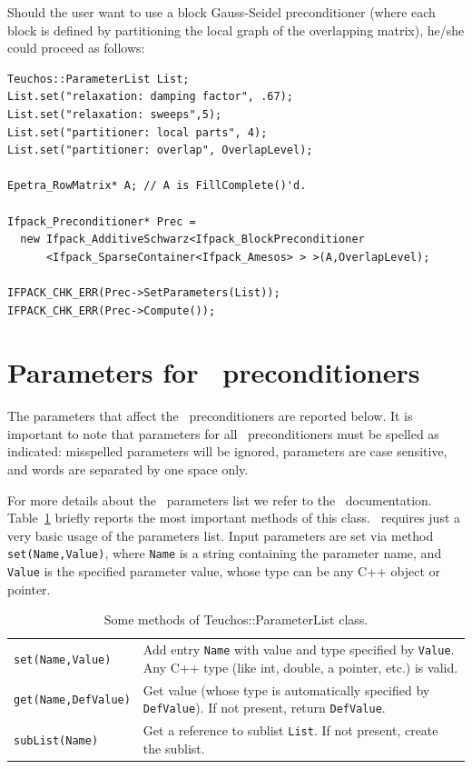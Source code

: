 {Should the user want to use a block Gauss-Seidel preconditioner (where each
block is defined by partitioning the local graph of the overlapping matrix),
he/she could proceed as follows:
\begin{verbatim}
Teuchos::ParameterList List;
List.set("relaxation: damping factor", .67);
List.set("relaxation: sweeps",5);
List.set("partitioner: local parts", 4);
List.set("partitioner: overlap", OverlapLevel);

Epetra_RowMatrix* A; // A is FillComplete()'d.

Ifpack_Preconditioner* Prec =
  new Ifpack_AdditiveSchwarz<Ifpack_BlockPreconditioner
      <Ifpack_SparseContainer<Ifpack_Amesos> > >(A,OverlapLevel);

IFPACK_CHK_ERR(Prec->SetParameters(List));
IFPACK_CHK_ERR(Prec->Compute());
\end{verbatim}

\section{Parameters for \ifpack\ preconditioners}
\label{sec:parameters}

The parameters that affect the \ifpack\ preconditioners are reported
below. It is important to note that parameters for all \ifpack\
preconditioners must be spelled as indicated:
misspelled parameters will be ignored, parameters are case sensitive, and words
  are separated by one space only.

\smallskip

For more details about the \teuchos\ parameters list we refer to the
\teuchos\ documentation.  Table~\ref{tab:teuchos} briefly reports the most
important methods of this class.
\ifpack\ requires just a very basic usage of the parameters list.
Input parameters are set via method \verb!set(Name,Value)!, where
\verb!Name! is a string containing the parameter name, and \verb!Value! is the
specified parameter value, whose type can be any C++ object or pointer. 

\begin{table}[htbp]
  \centering
  \begin{tabular}{| p{4cm} | p{10cm} |}
    \hline
    \verb!set(Name,Value)! & Add entry \verb!Name! with value and type
    specified by \verb!Value!. Any C++ type (like int, double, a
    pointer, etc.) is valid. \\
    \verb!get(Name,DefValue)! & Get value (whose type is automatically
    specified by \verb!DefValue!). If not present, return
    \verb!DefValue!. \\
    \verb!subList(Name)! & Get a reference to sublist \verb!List!. If not
    present, create the sublist. \\
    \hline
  \end{tabular}
  \caption{Some methods of Teuchos::ParameterList class.}
  \label{tab:teuchos}
\end{table}

}
